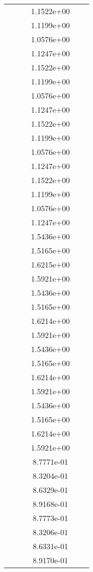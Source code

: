 \begin{xltabular}{\textwidth}{r|rS[table-format=1.3e+2]S[table-format=1.4e+2]S[table-format=1.4e+2]S[table-format=-1.5]}
&  &  & 1.1522e+00 & & \\
&  &  & 1.1199e+00 & & \\
&  &  & 1.0576e+00 & & \\
&  &  & 1.1247e+00 & & \\
&  &  & 1.1522e+00 & & \\
&  &  & 1.1199e+00 & & \\
&  &  & 1.0576e+00 & & \\
&  &  & 1.1247e+00 & & \\
&  &  & 1.1522e+00 & & \\
&  &  & 1.1199e+00 & & \\
&  &  & 1.0576e+00 & & \\
&  &  & 1.1247e+00 & & \\
&  &  & 1.1522e+00 & & \\
&  &  & 1.1199e+00 & & \\
&  &  & 1.0576e+00 & & \\
&  &  & 1.1247e+00 & & \\
&  &  & 1.5436e+00 & & \\
&  &  & 1.5165e+00 & & \\
&  &  & 1.6215e+00 & & \\
&  &  & 1.5921e+00 & & \\
&  &  & 1.5436e+00 & & \\
&  &  & 1.5165e+00 & & \\
&  &  & 1.6214e+00 & & \\
&  &  & 1.5921e+00 & & \\
&  &  & 1.5436e+00 & & \\
&  &  & 1.5165e+00 & & \\
&  &  & 1.6214e+00 & & \\
&  &  & 1.5921e+00 & & \\
&  &  & 1.5436e+00 & & \\
&  &  & 1.5165e+00 & & \\
&  &  & 1.6214e+00 & & \\
&  &  & 1.5921e+00 & & \\
&  &  & 8.7771e-01 & & \\
&  &  & 8.3204e-01 & & \\
&  &  & 8.6329e-01 & & \\
&  &  & 8.9168e-01 & & \\
&  &  & 8.7773e-01 & & \\
&  &  & 8.3206e-01 & & \\
&  &  & 8.6331e-01 & & \\
&  &  & 8.9170e-01 & & \\

\end{xltabular}

